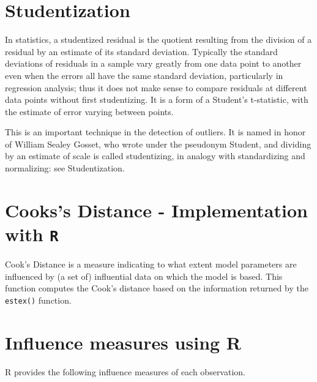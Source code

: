 \documentclass[12pt, a4paper]{report}
\theoremstyle{plain}
\theoremstyle{definition}
\theoremstyle{remark}
\begin{document}
	\section{Studentization}
	In statistics, a studentized residual is the quotient resulting from the division of a residual by an estimate of its standard deviation. Typically the standard deviations of residuals in a sample vary greatly from one data point to another even when the errors all have the same standard deviation, particularly in regression analysis; thus it does not make sense to compare residuals at different data points without first studentizing. It is a form of a Student's t-statistic, with the estimate of error varying between points.
	
	This is an important technique in the detection of outliers. It is named in honor of William Sealey Gosset, who wrote under the pseudonym Student, and dividing by an estimate of scale is called studentizing, in analogy with standardizing and normalizing: see Studentization.
	
	
	
	\section{Cooks's Distance - Implementation with \texttt{R}}
	Cook's Distance is a measure indicating to what extent model parameters are influenced by (a set of) influential data on which the model is based. This function computes the Cook's distance based on the information returned by the \texttt{estex()} function.
	
	
	
	\section{Influence measures using R}
	R provides the following influence measures of each observation.
	
	
\end{document}
